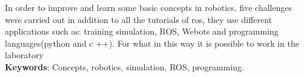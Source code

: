 \begin{thesisabastract}
In order to improve and learn some basic concepts in robotics, five challenges were carried out in addition to all the tutorials
of ros, they use different applications such as: training simulation, ROS, Webots and programming languages(python and c ++). For what
in this way it is possible to work in the laboratory
\ \\


\textbf{Keywords}: Concepts, robotics, simulation, ROS, programming.

\end{thesisabastract}
